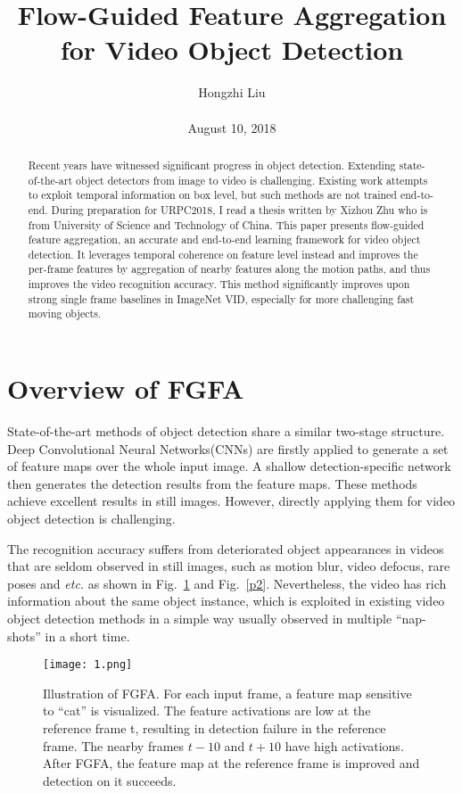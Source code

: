 \documentclass[10pt,twocolumn,letterpaper]{article}
\title{Flow-Guided Feature Aggregation for Video Object Detection}
\author{Hongzhi Liu\\\\
August 10, 2018}
\begin{document}
\maketitle
\begin{abstract}
	Recent years have witnessed significant progress in object detection. Extending state-of-the-art object detectors from image to video is challenging. Existing work attempts to exploit temporal information on box level, but such methods	are not trained end-to-end. During preparation for URPC2018, I read a thesis written by Xizhou Zhu who is from University of Science and Technology of China. This paper presents flow-guided feature  aggregation, an accurate and end-to-end learning framework for video object detection. It leverages temporal coherence on feature level instead and improves the per-frame features by aggregation of nearby features along the motion paths, and thus improves the video recognition accuracy. This method significantly improves upon strong single frame baselines in ImageNet VID, especially for more challenging fast moving objects.
\end{abstract}

\section{Overview of FGFA}

State-of-the-art methods of object detection share a similar two-stage structure. Deep Convolutional Neural Networks(CNNs) \cite{Krizhevsky2012ImageNet,Simonyan2014Very} are firstly applied to generate a set of feature maps over the whole input image. A shallow detection-specific network \cite{He2014Spatial,Girshick2015Fast,Ren2015Faster} then generates the detection results from the feature maps. These methods achieve excellent results in still images. However, directly applying them for video object detection is challenging.

The recognition accuracy suffers from deteriorated object appearances in videos that are seldom observed in still images, such as motion blur, video defocus, rare poses and \emph{etc.} as shown in Fig.~\ref{p1} and Fig.~\ref{p2}. Nevertheless, the video has rich information about the same object instance, which is exploited in existing video object detection methods \cite{Kang2016Object} in a simple way usually observed in multiple ``nap-shots'' in a short time.
\begin{figure}
	\begin{center}
		\texttt{[image: 1.png]}
	\end{center}
	\caption{Illustration of FGFA. For each input frame, a feature map sensitive to ``cat'' is visualized. The feature activations are low at the reference frame t, resulting in	detection failure in the reference frame. The nearby frames $t−10$ and $t+10$ have high activations. After FGFA, the feature map at the reference frame is improved and detection on it succeeds.}
	\label{p1}
\end{figure}
\end{document}
